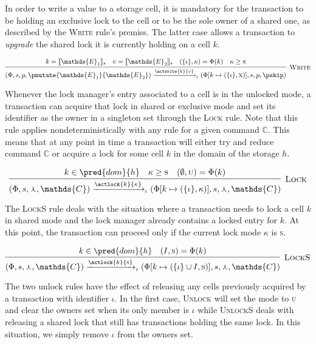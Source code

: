 In order to write a value to a storage cell, it is mandatory for the transaction to be holding an exclusive lock to the cell or to be the sole owner of a shared one, as described by the \textsc{Write} rule's premiss. The latter case allows a transaction to \textit{upgrade} the shared lock it is currently holding on a cell $k$.

\[
\infer[\textsc{Write}]
{
	(\Phi, s, p, \pmutate{\mathds{E}_1}{\mathds{E}_2})
	\xrightarrow{\actwrite{k}{v}}_\iota
	(\Phi[k \mapsto (\{\iota\}, \textsc{x})], s, p, \pskip)
}
{
	k = \llbracket \mathds{E}_1 \rrbracket_s &
	v = \llbracket \mathds{E}_2 \rrbracket_s &
	(\{ \iota \}, \kappa) = \Phi(k) &
	\kappa \geq \textsc{s}
}
\]

Whenever the lock manager's entry associated to a cell is in the unlocked mode, a transaction can acquire that lock in shared or exclusive mode and set its identifier as the owner in a singleton set through the \textsc{Lock} rule. Note that this rule applies nondeterministically with any rule for a given command $\mathds{C}$. This means that at any point in time a transaction will either try and reduce command $\mathds{C}$ or acquire a lock for some cell $k$ in the domain of the storage $h$.

\[
\infer[\textsc{Lock}]
{
	(\Phi, s, \curlywedge, \mathds{C})
	\xrightarrow{\actlock{k}{\kappa}}_\iota
	(\Phi[k \mapsto (\{\iota\}, \kappa)], s, \curlywedge, \mathds{C})
}
{
	k \in \pred{dom}{h} &
	\kappa \geq \textsc{s} &
	(\emptyset, \textsc{u}) = \Phi(k)
}
\]

The \textsc{LockS} rule deals with the situation where a transaction needs to lock a cell $k$ in shared mode and the lock manager already contains a locked entry for $k$. At this point, the transaction can proceed only if the current lock mode $\kappa$ is \textsc{s}.

\[
\infer[\textsc{LockS}]
{
	(\Phi, s, \curlywedge, \mathds{C})
	\xrightarrow{\actlock{k}{\textsc{s}}}_\iota
	(\Phi[k \mapsto (\{\iota\} \cup I, \textsc{s})], s, \curlywedge, \mathds{C})
}
{
	k \in \pred{dom}{h} &
	(I, \textsc{s}) = \Phi(k)
}
\]

The two unlock rules have the effect of releasing any cells previously acquired by a transaction with identifier $\iota$. In the first case, \textsc{Unlock} will set the mode to \textsc{u} and clear the owners set when its only member is $\iota$ while \textsc{UnlockS} deals with releasing a shared lock that still has transactions holding the same lock. In this situation, we simply remove $\iota$ from the owners set.

